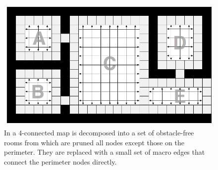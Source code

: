 \begin{figure}[tb]
       \begin{center}
                       \includegraphics[scale=0.30, trim = 10mm 10mm 10mm 0mm]{diagrams/overview.png}
       \end{center}
	\vspace{-3pt}
       \caption{In \cite{harabor10} a 4-connected map is decomposed into a set of obstacle-free rooms from which are pruned all nodes except those on the perimeter.
				They are replaced with a small set of macro edges that connect the perimeter nodes directly.}
       \label{fig-overview}
\end{figure}
